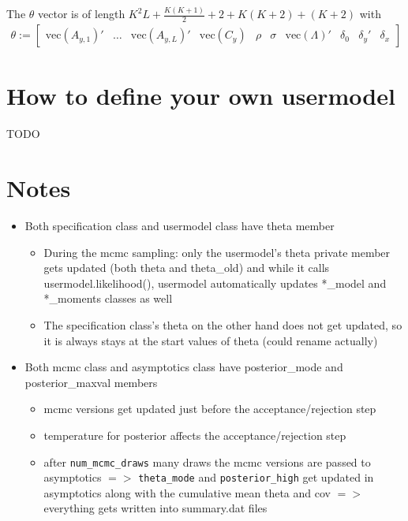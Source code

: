 \documentclass[11pt, letterpaper, notitlepage]{article}
\begin{document}
The $\theta$ vector is of length $K^2L + \frac{K(K+1)}{2} + 2 + K(K+2) + (K+2)$ with 
\begin{align*}
\theta :=\begin{bmatrix}
 \text{vec}\left(A_{y, 1}\right)' & \dots & \text{vec}\left(A_{y, L}\right)' & \text{vec}\left(C_y\right) & \rho & \sigma & \text{vec}\left(\Lambda\right)' &  \delta_0 & \delta_y' & \delta_x
\end{bmatrix}
\end{align*}

\pagebreak


\section{How to define your own usermodel}

TODO


\pagebreak 

\section*{Notes}

\begin{itemize}
\item Both specification class and usermodel class have theta member
\begin{itemize}
\item During the mcmc sampling: only the usermodel's theta private member gets updated (both theta and theta\_old) and while it calls usermodel.likelihood(), usermodel automatically updates *\_model and *\_moments classes as well
\item The specification class's theta on the other hand does not get updated, so it is always stays at the start values of theta (could rename actually)
\end{itemize}

\item Both mcmc class and asymptotics class have posterior\_mode and posterior\_maxval members
\begin{itemize}
\item mcmc versions get updated just before the acceptance/rejection step 
\item temperature for posterior affects the acceptance/rejection step 
\item after \texttt{num\_mcmc\_draws} many draws the mcmc versions are passed to asymptotics $=>$ \texttt{theta\_mode} and \texttt{posterior\_high} get updated in asymptotics along with the cumulative mean theta and cov $=>$ everything gets written into summary.dat files 
\end{itemize}
\end{itemize}


\newpage
\appendix
\vspace{48pt}


\end{document}
